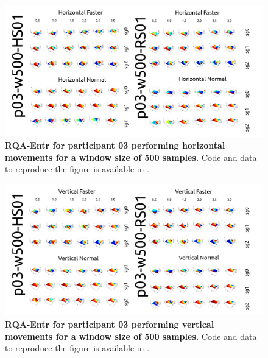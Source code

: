 \documentclass[12pt]{article}
\begin{document}
\newpage
\begin{figure}[ht!]
\centering
\includegraphics{figures/rqa/output/epsilons/rqa-epsilonsp03w500Horizontal}
    	\caption{
	{\bf RQA-Entr for participant 03 performing horizontal movements for a window size of 500 samples.}
	Code and data to reproduce the figure is available in \cite{srep2021}.
        }
    \label{fig-p03-H-w500}
\end{figure}
\begin{figure}[hb!]
\centering
\includegraphics{figures/rqa/output/epsilons/rqa-epsilonsp03w500Vertical}
    	\caption{
	{\bf RQA-Entr for participant 03 performing vertical movements for a window size of 500 samples.}
	Code and data to reproduce the figure is available in \cite{srep2021}.
        }
    \label{fig-p03-V-w500}
\end{figure}
\end{document}
